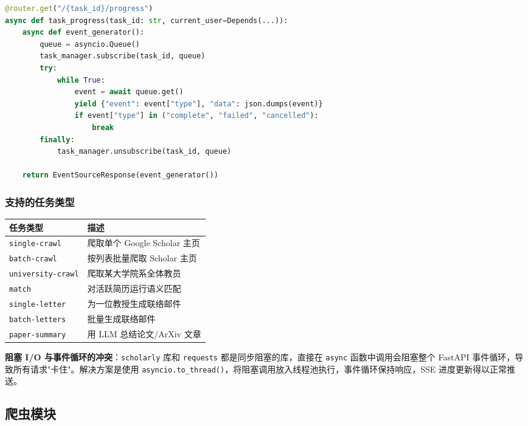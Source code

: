 \documentclass[11pt]{article}
\begin{document}
\begin{lstlisting}[language=Python, caption=SSE 进度流端点]
@router.get("/{task_id}/progress")
async def task_progress(task_id: str, current_user=Depends(...)):
    async def event_generator():
        queue = asyncio.Queue()
        task_manager.subscribe(task_id, queue)
        try:
            while True:
                event = await queue.get()
                yield {"event": event["type"], "data": json.dumps(event)}
                if event["type"] in ("complete", "failed", "cancelled"):
                    break
        finally:
            task_manager.unsubscribe(task_id, queue)

    return EventSourceResponse(event_generator())
\end{lstlisting}

\subsubsection{支持的任务类型}

\begin{center}
\begin{tabular}{|l|l|}
\hline
\textbf{任务类型} & \textbf{描述} \\
\hline
\texttt{single-crawl} & 爬取单个 Google Scholar 主页 \\
\texttt{batch-crawl} & 按列表批量爬取 Scholar 主页 \\
\texttt{university-crawl} & 爬取某大学院系全体教员 \\
\texttt{match} & 对活跃简历运行语义匹配 \\
\texttt{single-letter} & 为一位教授生成联络邮件 \\
\texttt{batch-letters} & 批量生成联络邮件 \\
\texttt{paper-summary} & 用 LLM 总结论文/ArXiv 文章 \\
\hline
\end{tabular}
\end{center}

\begin{thinkquestion}
\textbf{阻塞 I/O 与事件循环的冲突}：\texttt{scholarly} 库和 \texttt{requests} 都是同步阻塞的库，直接在 \texttt{async} 函数中调用会阻塞整个 FastAPI 事件循环，导致所有请求"卡住"。解决方案是使用 \texttt{asyncio.to\_thread()}，将阻塞调用放入线程池执行，事件循环保持响应，SSE 进度更新得以正常推送。
\end{thinkquestion}

\subsection{爬虫模块}
\end{document}
